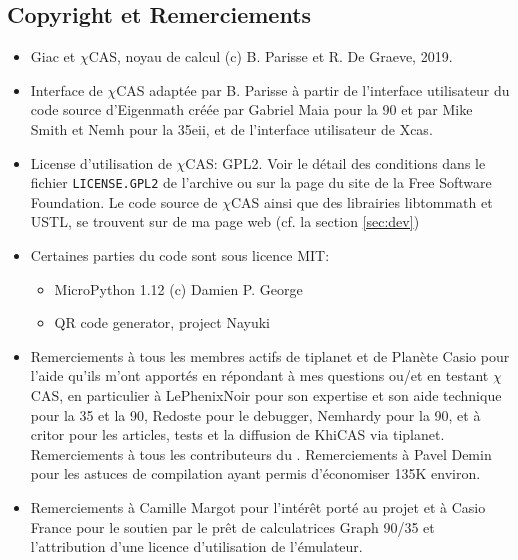 \documentclass{article}
\begin{document}
\begin{giacjshere}
\section{Copyright et Remerciements}
\begin{itemize}
\item Giac et $\chi$CAS, noyau de calcul (c) B. Parisse et R. De Graeve, 2019.
\item Interface de $\chi$CAS adapt\'ee par B. Parisse \`a partir
de l'interface utilisateur du code source d'Eigenmath
cr\'e\'ee par Gabriel Maia pour la 90 et par Mike Smith et Nemh pour
la 35eii, et de l'interface utilisateur de Xcas.
\item
License d'utilisation de $\chi$CAS: GPL2. Voir le d\'etail
des conditions dans le fichier \verb|LICENSE.GPL2| de l'archive
ou sur la page
du site de la Free Software Foundation.
Le code source de $\chi$CAS ainsi que des librairies 
libtommath et USTL, se trouvent sur
 de ma page web (cf. la section \ref{sec:dev})
\item Certaines parties du code sont sous licence MIT: 
\begin{itemize}
\item {}
{MicroPython 1.12 (c) Damien P. George}
\item {}
{QR code generator, project Nayuki}
\end{itemize}
\item Remerciements \`a tous les membres actifs de tiplanet et
de Plan\`ete Casio pour l'aide qu'ils m'ont apport\'es
en r\'epondant \`a mes questions ou/et en testant $\chi$CAS,
en particulier \`a LePhenixNoir pour son expertise 
et son aide technique pour la 35 et la 90, Redoste pour le
debugger, Nemhardy pour la 90, et \`a critor
pour les articles, tests et la diffusion de KhiCAS via tiplanet.
Remerciements \`a tous les contributeurs du
.
Remerciements \`a Pavel Demin pour les astuces de compilation ayant
permis d'\'economiser 135K environ.
\item Remerciements \`a Camille Margot pour l'int\'er\^et
port\'e au projet et \`a Casio France pour le soutien par le pr\^et de
calculatrices Graph 90/35 et l'attribution 
d'une licence d'utilisation de l'\'emulateur.
\end{itemize}


\end{giacjshere}
\end{document}
